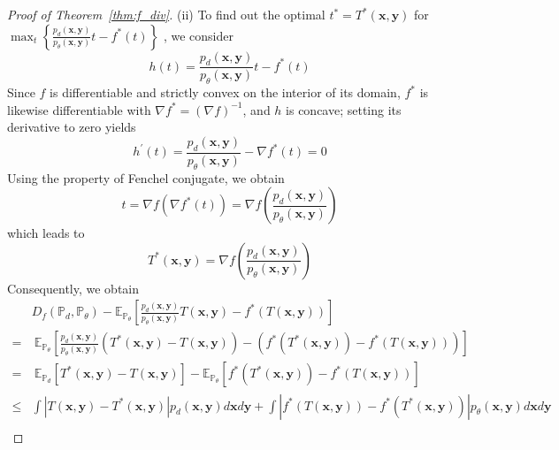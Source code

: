 \begin{proof}[Proof of Theorem~\ref{thm:f_div}]
(ii) To find out the optimal $t^*=T^*(\boldsymbol{x}, \boldsymbol{y})$ for $\max_{t}\left\{ \frac{p_{d}\left(\boldsymbol{x},\boldsymbol{y}\right)}{p_{\theta}\left(\boldsymbol{x},\boldsymbol{y}\right)}t-f^{*}\left(t\right)\right\} $ , we consider
\[
h\left(t\right)=\frac{p_{d}\left(\boldsymbol{x},\boldsymbol{y}\right)}{p_{\theta}\left(\boldsymbol{x},\boldsymbol{y}\right)}t-f^{*}\left(t\right)
\]
Since $f$ is differentiable and strictly convex on the interior of its domain, $f^*$ is likewise differentiable with $\nabla f^* = (\nabla f)^{-1}$, and $h$ is concave; setting its derivative to zero yields
\[
h^{'}\left(t\right)=\frac{p_{d}\left(\boldsymbol{x},\boldsymbol{y}\right)}{p_{\theta}\left(\boldsymbol{x},\boldsymbol{y}\right)}-\nabla f^{*}\left(t\right)=0
\]
Using the property of Fenchel conjugate, we obtain
\[
t=\nabla f\left(\nabla f^{*}\left(t\right)\right)=\nabla f\left(\frac{p_{d}\left(\boldsymbol{x},\boldsymbol{y}\right)}{p_{\theta}\left(\boldsymbol{x},\boldsymbol{y}\right)}\right)
\]
which leads to
\[
T^{*}\left(\boldsymbol{x},\boldsymbol{y}\right)=\nabla f\left(\frac{p_{d}\left(\boldsymbol{x},\boldsymbol{y}\right)}{p_{\theta}\left(\boldsymbol{x},\boldsymbol{y}\right)}\right)
\]
Consequently, we obtain
\begin{align*}
 & D_{f}\left(\mathbb{P}_{d},\mathbb{P}_{\theta}\right)-\mathbb{E}_{\mathbb{P}_{\theta}}\left[\frac{p_{d}\left(\boldsymbol{x},\boldsymbol{y}\right)}{p_{\theta}\left(\boldsymbol{x},\boldsymbol{y}\right)}T\left(\boldsymbol{x},\boldsymbol{y}\right)-f^{*}\left(T\left(\boldsymbol{x},\boldsymbol{y}\right)\right)\right]\\
= & \ \mathbb{E}_{\mathbb{P}_{\theta}}\left[\frac{p_{d}\left(\boldsymbol{x},\boldsymbol{y}\right)}{p_{\theta}\left(\boldsymbol{x},\boldsymbol{y}\right)}\left(T^{*}\left(\boldsymbol{x},\boldsymbol{y}\right)-T\left(\boldsymbol{x},\boldsymbol{y}\right)\right)-\left(f^{*}\left(T^{*}\left(\boldsymbol{x},\boldsymbol{y}\right)\right)-f^{*}\left(T\left(\boldsymbol{x},\boldsymbol{y}\right)\right)\right)\right]\\
= & \ \mathbb{E}_{\mathbb{P}_{d}}\left[T^{*}\left(\boldsymbol{x},\boldsymbol{y}\right)-T\left(\boldsymbol{x},\boldsymbol{y}\right)\right]-\mathbb{E}_{\mathbb{P}_{\theta}}\left[f^{*}\left(T^{*}\left(\boldsymbol{x},\boldsymbol{y}\right)\right)-f^{*}\left(T\left(\boldsymbol{x},\boldsymbol{y}\right)\right)\right]\\
\leq & \int\left|T\left(\boldsymbol{x},\boldsymbol{y}\right)-T^{*}\left(\boldsymbol{x},\boldsymbol{y}\right)\right|p_{d}\left(\boldsymbol{x,y}\right)d\boldsymbol{x}d\boldsymbol{y}+\int\left|f^{*}\left(T\left(\boldsymbol{x},\boldsymbol{y}\right)\right)-f^{*}\left(T^{*}\left(\boldsymbol{x},\boldsymbol{y}\right)\right)\right|p_{\theta}\left(\boldsymbol{x,y}\right)d\boldsymbol{x}d\boldsymbol{y}\\

\end{align*}
\end{proof}
